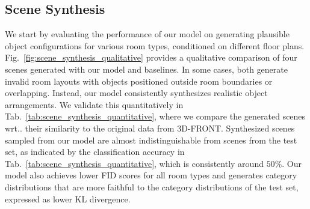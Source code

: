 \documentclass{article}
\makeatletter
\DeclareRobustCommand\onedot{\futurelet\@let@token\@onedot}
\def\@onedot{\ifx\@let@token.\else.\null\fi\xspace}
\def\wrt{wrt\onedot}
\newcommand{\figref}[1]{Fig.~\ref{#1}}
\newcommand{\tabref}[1]{Tab.~\ref{#1}}
\makeatother
\begin{document}
\subsection{Scene Synthesis}
We start by evaluating the performance of our model on generating
plausible object configurations for various room types, conditioned on
different floor plans. \figref{fig:scene_synthesis_qualitative} provides a
qualitative comparison of four scenes generated with our model and baselines.
In some cases, both \cite{Ritchie2019CVPR, Wang2020ARXIV} generate invalid room
layouts with objects positioned outside room boundaries or overlapping.
Instead, our model consistently synthesizes realistic object
arrangements. We validate this quantitatively in
\tabref{tab:scene_synthesis_quantitative}, where we compare the generated
scenes \wrt their similarity to the original data from 3D-FRONT. Synthesized scenes
sampled from our model are almost indistinguishable from scenes from the test
set, as indicated by the classification accuracy in
\tabref{tab:scene_synthesis_quantitative}, which is consistently around $50\%$.
Our model also achieves lower FID scores for all room types and
generates category distributions that are more faithful to the category
distributions of the test set, expressed as lower KL divergence.
\end{document}

